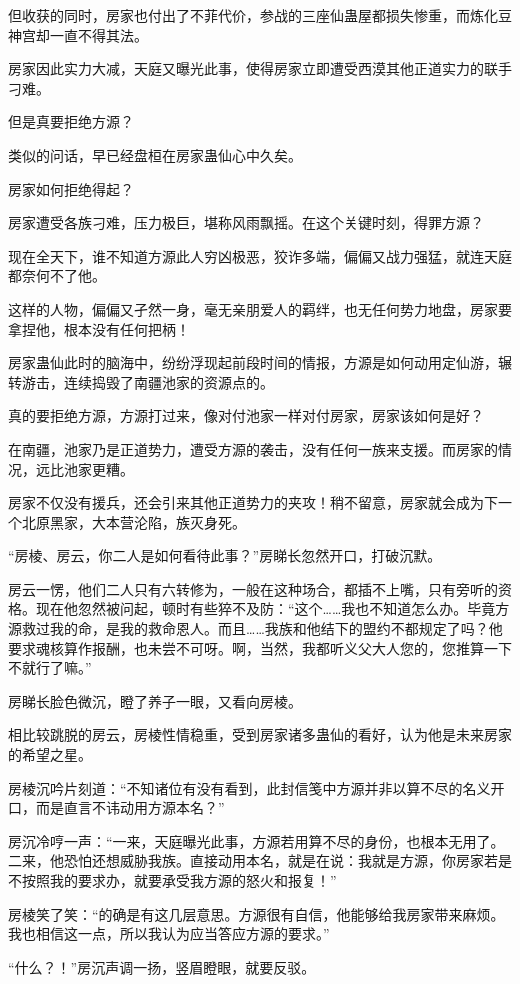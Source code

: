 \begin{this_body}
但收获的同时，房家也付出了不菲代价，参战的三座仙蛊屋都损失惨重，而炼化豆神宫却一直不得其法。

房家因此实力大减，天庭又曝光此事，使得房家立即遭受西漠其他正道实力的联手刁难。

但是真要拒绝方源？

类似的问话，早已经盘桓在房家蛊仙心中久矣。

房家如何拒绝得起？

房家遭受各族刁难，压力极巨，堪称风雨飘摇。在这个关键时刻，得罪方源？

现在全天下，谁不知道方源此人穷凶极恶，狡诈多端，偏偏又战力强猛，就连天庭都奈何不了他。

这样的人物，偏偏又孑然一身，毫无亲朋爱人的羁绊，也无任何势力地盘，房家要拿捏他，根本没有任何把柄！

房家蛊仙此时的脑海中，纷纷浮现起前段时间的情报，方源是如何动用定仙游，辗转游击，连续捣毁了南疆池家的资源点的。

真的要拒绝方源，方源打过来，像对付池家一样对付房家，房家该如何是好？

在南疆，池家乃是正道势力，遭受方源的袭击，没有任何一族来支援。而房家的情况，远比池家更糟。

房家不仅没有援兵，还会引来其他正道势力的夹攻！稍不留意，房家就会成为下一个北原黑家，大本营沦陷，族灭身死。

“房棱、房云，你二人是如何看待此事？”房睇长忽然开口，打破沉默。

房云一愣，他们二人只有六转修为，一般在这种场合，都插不上嘴，只有旁听的资格。现在他忽然被问起，顿时有些猝不及防：“这个……我也不知道怎么办。毕竟方源救过我的命，是我的救命恩人。而且……我族和他结下的盟约不都规定了吗？他要求魂核算作报酬，也未尝不可呀。啊，当然，我都听义父大人您的，您推算一下不就行了嘛。”

房睇长脸色微沉，瞪了养子一眼，又看向房棱。

相比较跳脱的房云，房棱性情稳重，受到房家诸多蛊仙的看好，认为他是未来房家的希望之星。

房棱沉吟片刻道：“不知诸位有没有看到，此封信笺中方源并非以算不尽的名义开口，而是直言不讳动用方源本名？”

房沉冷哼一声：“一来，天庭曝光此事，方源若用算不尽的身份，也根本无用了。二来，他恐怕还想威胁我族。直接动用本名，就是在说：我就是方源，你房家若是不按照我的要求办，就要承受我方源的怒火和报复！”

房棱笑了笑：“的确是有这几层意思。方源很有自信，他能够给我房家带来麻烦。我也相信这一点，所以我认为应当答应方源的要求。”

“什么？！”房沉声调一扬，竖眉瞪眼，就要反驳。


\end{this_body}
